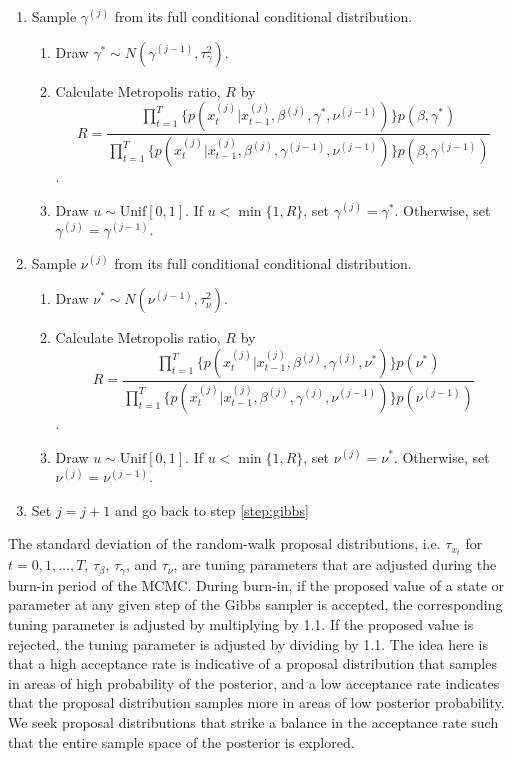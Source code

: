 \begin{enumerate}
\begin{enumerate}[label=\alph*.,leftmargin=1.75\parindent]
    \end{enumerate}
\item Sample $\gamma^{(j)}$ from its full conditional conditional distribution.
    \begin{enumerate}[label=\alph*.,leftmargin=1.75\parindent]
    \item Draw $\gamma^* \sim N(\gamma^{(j-1)},\tau^2_{\gamma})$.
    \item Calculate Metropolis ratio, $R$ by
    \[R = \frac{\prod_{t=1}^T \{p(x^{(j)}_t|x^{(j)}_{t-1},\beta^{(j)},\gamma^*,\nu^{(j-1)})\}p(\beta, \gamma^*)}{\prod_{t=1}^T \{p(x^{(j)}_t|x^{(j)}_{t-1},\beta^{(j)},\gamma^{(j-1)},\nu^{(j-1)})\}p(\beta, \gamma^{(j-1)})}\].
    \item Draw $u \sim \mbox{Unif}[0,1]$. If $u < \min\{1, R\}$, set $\gamma^{(j)} = \gamma^*$. Otherwise, set $\gamma^{(j)} = \gamma^{(j-1)}$.
    \end{enumerate}
\item Sample $\nu^{(j)}$ from its full conditional conditional distribution.
    \begin{enumerate}[label=\alph*.,leftmargin=1.75\parindent]
    \item Draw $\nu^* \sim N(\nu^{(j-1)},\tau^2_{\nu})$.
    \item Calculate Metropolis ratio, $R$ by
    \[R = \frac{\prod_{t=1}^T \{p(x^{(j)}_t|x^{(j)}_{t-1},\beta^{(j)},\gamma^{(j)},\nu^*)\}p(\nu^*)}{\prod_{t=1}^T \{p(x^{(j)}_t|x^{(j)}_{t-1},\beta^{(j)},\gamma^{(j)},\nu^{(j-1)})\}p(\nu^{(j-1)})}\].
    \item Draw $u \sim \mbox{Unif}[0,1]$. If $u < \min\{1, R\}$, set $\nu^{(j)} = \nu^*$. Otherwise, set $\nu^{(j)} = \nu^{(j-1)}$.
    \end{enumerate}
\item Set $j = j + 1$ and go back to step \ref{step:gibbs}
\end{enumerate}
The standard deviation of the random-walk proposal distributions, i.e. $\tau_{x_t}$ for $t = 0,1,\ldots,T$, $\tau_{\beta}$, $\tau_{\gamma}$, and $\tau_{\nu}$, are tuning parameters that are adjusted during the burn-in period of the MCMC. During burn-in, if the proposed value of a state or parameter at any given step of the Gibbs sampler is accepted, the corresponding tuning parameter is adjusted by multiplying by 1.1. If the proposed value is rejected, the tuning parameter is adjusted by dividing by 1.1. The idea here is that a high acceptance rate is indicative of a proposal distribution that samples in areas of high probability of the posterior, and a low acceptance rate indicates that the proposal distribution samples more in areas of low posterior probability. We seek proposal distributions that strike a balance in the acceptance rate such that the entire sample space of the posterior is explored.

